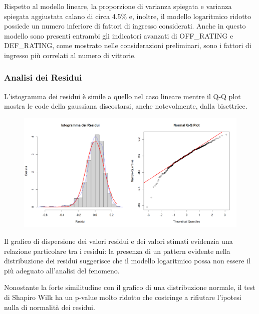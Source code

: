 \documentclass[11pt,a4paper]{article}
\begin{document}
Rispetto al modello lineare, la proporzione di varianza spiegata e varianza spiegata aggiustata calano di circa 4.5\% e, inoltre, il modello logaritmico ridotto possiede un numero inferiore di fattori di ingresso considerati. Anche in questo modello sono presenti entrambi gli indicatori avanzati di OFF\_RATING e DEF\_RATING, come mostrato nelle considerazioni preliminari, sono i fattori di ingresso più correlati al numero di vittorie.

\subsubsection{Analisi dei Residui}
 L'istogramma dei residui è simile a quello nel caso lineare mentre il Q-Q plot mostra le code della gaussiana discostarsi, anche notevolmente, dalla bisettrice.

\begin{figure}[h]
    \hspace{-1.5cm}
	\includegraphics[scale=0.55]{imgs/residuals_analysis_log_model.png}
    \end{figure}
\vspace{-0.4cm}

Il grafico di dispersione dei valori residui e dei valori stimati evidenzia una relazione particolare tra i residui: la presenza di un pattern evidente nella distribuzione dei residui suggerisce che il modello logaritmico possa non essere il più adeguato all'analisi del fenomeno.

Nonostante la forte similitudine con il grafico di una distribuzione normale, il test di Shapiro Wilk ha un p-value molto ridotto che costringe a rifiutare l'ipotesi nulla di normalità dei residui.
\end{document}
